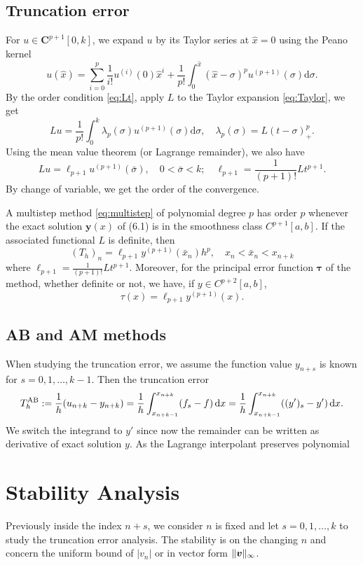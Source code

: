 \documentclass[10pt]{amsart}
\begin{document}
\subsection{Truncation error}
For ${u} \in \boldsymbol{C}^{p+1}[0, k]$, we expand $u$ by its Taylor series at $\hat x = 0$ using the Peano kernel
\begin{equation}\label{eq:Taylor}
u(\hat x) = \sum_{i=0}^p \frac{1}{i!}u^{(i)}(0) \hat x^i + \frac{1}{p!} \int_0^{\hat x} (\hat x- \sigma)^p {u}^{(p+1)}(\sigma) \mathrm{d} \sigma.
\end{equation}
By the order condition \eqref{eq:Lt}, apply $L$ to the Taylor expansion \eqref{eq:Taylor}, we get
$$
L {u}=\frac{1}{p!} \int_0^k \lambda_p(\sigma) {u}^{(p+1)}(\sigma) \mathrm{d} \sigma, \quad \lambda_p(\sigma)=L(t-\sigma)_{+}^p.
$$
Using the mean value theorem (or Lagrange remainder), we also have
$$
L {u}=\ell_{p+1} {u}^{(p+1)}(\bar{\sigma}), \quad 0<\bar{\sigma}<k ; \quad \ell_{p+1}= \frac{1}{(p+1)!} L t^{p+1}.
$$
By change of variable, we get the order of the convergence.

\begin{theorem}
A multistep method \eqref{eq:multistep} of polynomial degree $p$ has order $p$ whenever the exact solution $\boldsymbol{y}(x)$ of (6.1) is in the smoothness class $C^{p+1}[a, b]$. If the associated functional $L$ is definite, then
$$
\left({T}_h\right)_n=\ell_{p+1} {y}^{(p+1)}\left(\bar{x}_n\right) h^p, \quad x_n<\bar{x}_n<x_{n+k}
$$
where $\ell_{p+1} = \frac{1}{(p+1)!} L t^{p+1}$. Moreover, for the principal error function $\boldsymbol{\tau}$ of the method, whether definite or not, we have, if ${y} \in C^{p+2}[a, b]$,
$$
{\tau}(x)=\ell_{p+1} {y}^{(p+1)}(x).
$$
\end{theorem}

\subsection{AB and AM methods}
When studying the truncation error, we assume the function value $y_{n+s}$ is known for $s =0,1,\ldots,k-1$. Then the truncation error $$T_h^{\rm AB} := \frac{1}{h} (u_{n+k} - y_{n+k}) = \frac{1}{h} \int_{x_{n+k-1}}^{x_{n+k}} (f_s - f) \,{\rm d}x = \frac{1}{h} \int_{x_{n+k-1}}^{x_{n+k}} ((y')_s - y') \,{\rm d}x.$$
We switch the integrand to $y'$ since now the remainder can be written as derivative of exact solution $y$. As the Lagrange interpolant preserves polynomial  

\section{Stability Analysis}
Previously inside the index $n+s$, we consider $n$ is fixed and let $s=0,1,\ldots, k$ to study the truncation error analysis. The stability is on the changing $n$ and concern the uniform bound of $|v_n|$ or in vector form $\|\boldsymbol v\|_{\infty}$. 
\end{document}
